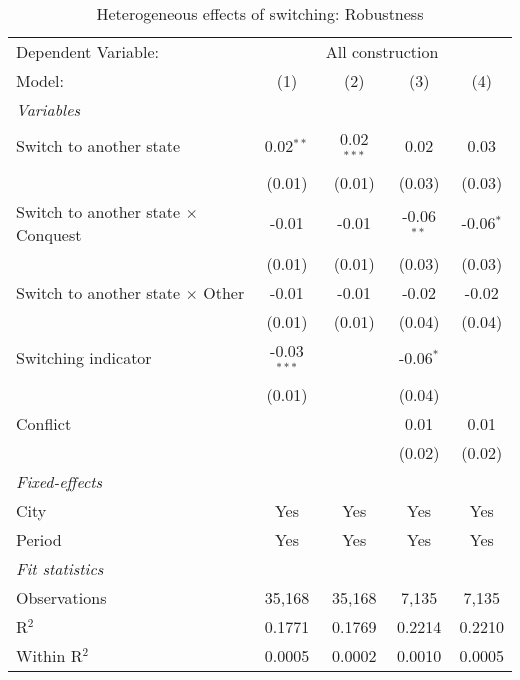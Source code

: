 \begin{table}[htbp]
   \caption{\label{tab:controls_10y} Heterogeneous effects of switching: Robustness}
   \centering
   \begin{tabular}{lcccc}
      \tabularnewline \midrule \midrule
      Dependent Variable: & \multicolumn{4}{c}{All construction}\\
      Model:                                     & (1)           & (2)          & (3)          & (4)\\  
      \midrule
      \emph{Variables}\\
      Switch to another state                    & 0.02$^{**}$   & 0.02$^{***}$ & 0.02         & 0.03\\   
                                                 & (0.01)        & (0.01)       & (0.03)       & (0.03)\\   
      Switch to another state $\times$ Conquest  & -0.01         & -0.01        & -0.06$^{**}$ & -0.06$^{*}$\\   
                                                 & (0.01)        & (0.01)       & (0.03)       & (0.03)\\   
      Switch to another state $\times$ Other     & -0.01         & -0.01        & -0.02        & -0.02\\   
                                                 & (0.01)        & (0.01)       & (0.04)       & (0.04)\\   
      Switching indicator                        & -0.03$^{***}$ &              & -0.06$^{*}$  &   \\   
                                                 & (0.01)        &              & (0.04)       &   \\   
      Conflict                                   &               &              & 0.01         & 0.01\\   
                                                 &               &              & (0.02)       & (0.02)\\   
      \midrule
      \emph{Fixed-effects}\\
      City                                       & Yes           & Yes          & Yes          & Yes\\  
      Period                                     & Yes           & Yes          & Yes          & Yes\\  
      \midrule
      \emph{Fit statistics}\\
      Observations                               & 35,168        & 35,168       & 7,135        & 7,135\\  
      R$^2$                                      & 0.1771        & 0.1769       & 0.2214       & 0.2210\\  
      Within R$^2$                               & 0.0005        & 0.0002       & 0.0010       & 0.0005\\  
      \midrule \midrule
      

\end{tabular}
\end{table}

